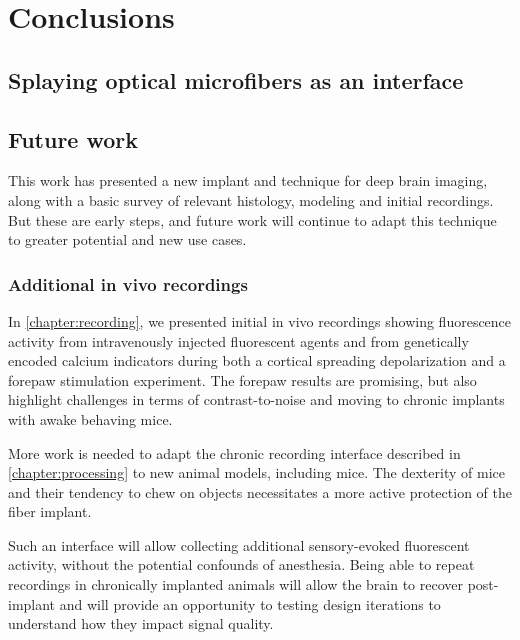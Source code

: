 \chapter{Conclusions}
\label{chapter:Conclusions}

\thispagestyle{myheadings}

\graphicspath{{7_Conclusion/Figures/}}

\section{Splaying optical microfibers as an interface}


\section{Future work}

This work has presented a new implant and technique
for deep brain imaging, along with a basic survey of 
relevant histology, modeling and initial recordings. 
But these are early steps, and future work will 
continue to adapt this technique to greater potential 
and new use cases.

\subsection{Additional in vivo recordings}

In \cref{chapter:recording}, we presented initial 
in vivo recordings showing fluorescence activity 
from intravenously injected fluorescent agents and 
from genetically encoded calcium indicators during 
both a cortical spreading depolarization and a 
forepaw stimulation experiment. The forepaw results 
are promising, but also highlight challenges in 
terms of contrast-to-noise and moving to chronic 
implants with awake behaving mice.

More work is needed to adapt the chronic recording 
interface described in \cref{chapter:processing} to 
new animal models, including mice. The dexterity of  
mice and their tendency to chew on objects necessitates 
a more active protection of the fiber implant.

Such an interface will allow collecting additional 
sensory-evoked fluorescent activity, without the 
potential confounds of anesthesia. Being able to 
repeat recordings in chronically implanted animals 
will allow the brain to recover post-implant and will 
provide an opportunity to testing design iterations 
to understand how they impact signal quality.

